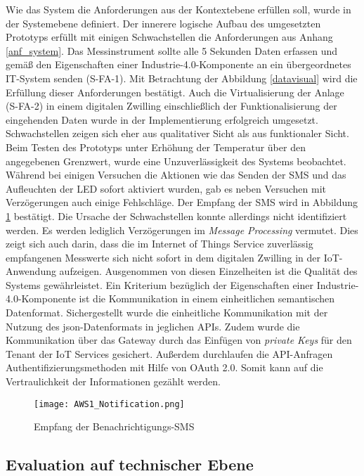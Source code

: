 Wie das System die Anforderungen aus der Kontextebene erfüllen soll, wurde in der Systemebene definiert. Der innerere logische Aufbau des umgesetzten Prototyps erfüllt mit einigen Schwachstellen die Anforderungen aus Anhang \ref{anf_system}.
Das Messinstrument sollte alle 5 Sekunden Daten erfassen und gemäß den Eigenschaften einer Industrie-4.0-Komponente an ein übergeordnetes IT-System senden (S-FA-1). Mit Betrachtung der Abbildung \ref{datavisual} wird die Erfüllung dieser Anforderungen bestätigt. Auch die Virtualisierung der Anlage (S-FA-2) in einem digitalen Zwilling einschließlich der Funktionalisierung der eingehenden Daten wurde in der Implementierung erfolgreich umgesetzt. 
Schwachstellen zeigen sich eher aus qualitativer Sicht als aus funktionaler Sicht. Beim Testen des Prototyps unter Erhöhung der Temperatur über den angegebenen Grenzwert, wurde eine Unzuverlässigkeit des Systems beobachtet. Während bei einigen Versuchen die Aktionen wie das Senden der SMS und das Aufleuchten der LED sofort aktiviert wurden, gab es neben Versuchen mit Verzögerungen auch einige Fehlschläge. Der Empfang der SMS wird in Abbildung \ref{awsnoti} bestätigt. Die Ursache der Schwachstellen konnte allerdings nicht identifiziert werden. Es werden lediglich Verzögerungen im \textit{Message Processing} vermutet. Dies zeigt sich auch darin, dass die im Internet of Things Service zuverlässig empfangenen Messwerte sich nicht sofort in dem digitalen Zwilling in der IoT-Anwendung aufzeigen. Ausgenommen von diesen Einzelheiten ist die Qualität des Systems gewährleistet. Ein Kriterium bezüglich der Eigenschaften einer Industrie-4.0-Komponente ist die Kommunikation in einem einheitlichen semantischen Datenformat. Sichergestellt wurde die einheitliche Kommunikation mit der Nutzung des \ac{json}-Datenformats in jeglichen APIs. Zudem wurde die Kommunikation über das Gateway durch das Einfügen von \textit{private Keys} für den Tenant der IoT Services gesichert. Außerdem durchlaufen die API-Anfragen Authentifizierungsmethoden mit Hilfe von OAuth 2.0. Somit kann auf die Vertraulichkeit der Informationen gezählt werden. 

\begin{figure}[ht]
    \centering
    \texttt{[image: AWS1\_Notification.png]}
    \caption{Empfang der Benachrichtigungs-SMS}
    \label{awsnoti}
\end{figure}

\subsection{Evaluation auf technischer Ebene}

